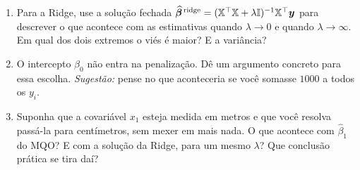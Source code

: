 \documentclass[11pt,a4paper]{article}
\begin{document}
\begin{exercicio}
\begin{enumerate}[label=(\alph*),leftmargin=1.1cm]
  \item Para a Ridge, use a solução fechada
        $\widehat{\bm{\beta}}^{\,\text{ridge}}=(\mathbb{X}^\top\mathbb{X}+\lambda\mathbb{I})^{-1}\mathbb{X}^\top\bm y$
        para descrever o que acontece com as estimativas quando $\lambda\to 0$ e
        quando $\lambda\to\infty$. Em qual dos dois extremos o viés é maior? E a
        variância?
  \item O intercepto $\beta_0$ não entra na penalização. Dê um argumento concreto
        para essa escolha. \emph{Sugestão:} pense no que aconteceria se você
        somasse $1000$ a todos os $y_i$.
  \item Suponha que a covariável $x_1$ esteja medida em metros e que você resolva
        passá-la para centímetros, sem mexer em mais nada. O que acontece com
        $\widehat\beta_1$ do MQO? E com a solução da Ridge, para um mesmo
        $\lambda$? Que conclusão prática se tira daí?
\end{enumerate}
\end{exercicio}
\end{document}
